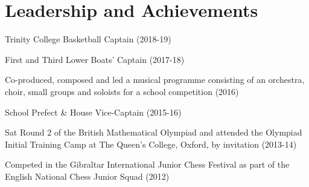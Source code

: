 \documentclass[letterpaper, 10pt]{article}
\begin{document}
\section*{Leadership and Achievements}
\vspace{-\baselineskip}
\begin{multicols}{2}
\begin{compact}
	\item Trinity College Basketball Captain (2018-19)
	\item First and Third Lower Boats' Captain (2017-18)
	\item Co-produced, composed and led a musical programme consisting of an orchestra, choir, small groups and soloists for a school competition (2016)
	\item School Prefect \& House Vice-Captain (2015-16)
	\vspace{-\baselineskip}
	\vfill\null\columnbreak
	\item Sat Round 2 of the British Mathematical Olympiad and attended the Olympiad Initial Training Camp at The Queen's College, Oxford, by invitation (2013-14)
	\item Competed in the Gibraltar International Junior Chess Festival as part of the English National Chess Junior Squad (2012)
	\vspace{-\baselineskip}
\end{compact}
\end{multicols}
\end{document}

